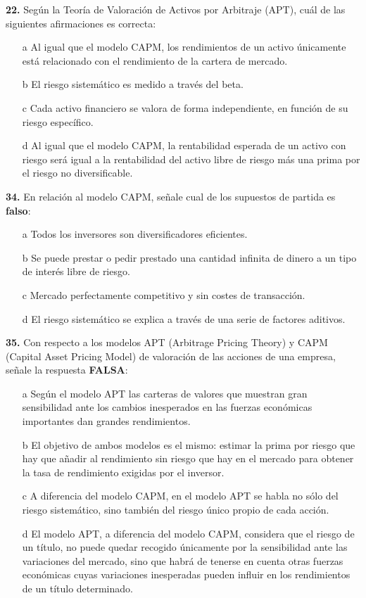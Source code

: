 \documentclass{nuevotema}
\begin{document}
\textbf{22.} Según la Teoría de Valoración de Activos por Arbitraje (APT), cuál de las siguientes afirmaciones es correcta:
\begin{enumerate}
	\item[a] Al igual que el modelo CAPM, los rendimientos de un activo únicamente está relacionado con el rendimiento de la cartera de mercado.
	\item[b] El riesgo sistemático es medido a través del beta.
	\item[c] Cada activo financiero se valora de forma independiente, en función de su riesgo específico.
	\item[d] Al igual que el modelo CAPM, la rentabilidad esperada de un activo con riesgo será igual a la rentabilidad del activo libre de riesgo más una prima por el riesgo no diversificable. 
\end{enumerate}

\textbf{34.} En relación al modelo CAPM, señale cual de los supuestos de partida es \textbf{falso}:
\begin{enumerate}
	\item[a] Todos los inversores son diversificadores eficientes.
	\item[b] Se puede prestar o pedir prestado una cantidad infinita de dinero a un tipo de interés libre de riesgo.
	\item[c] Mercado perfectamente competitivo y sin costes de transacción.
	\item[d] El riesgo sistemático se explica a través de una serie de factores aditivos.
\end{enumerate}

\textbf{35.} Con respecto a los modelos APT (Arbitrage Pricing Theory) y CAPM (Capital Asset Pricing Model) de valoración de las acciones de una empresa, señale la respuesta \textbf{FALSA}:
\begin{enumerate}
	\item[a] Según el modelo APT las carteras de valores que muestran gran sensibilidad ante los cambios inesperados en las fuerzas económicas importantes dan grandes rendimientos.
	\item[b] El objetivo de ambos modelos es el mismo: estimar la prima por riesgo que hay que añadir al rendimiento sin riesgo que hay en el mercado para obtener la tasa de rendimiento exigidas por el inversor.
	\item[c] A diferencia del modelo CAPM, en el modelo APT se habla no sólo del riesgo sistemático, sino también del riesgo único propio de cada acción.
	\item[d] El modelo APT, a diferencia del modelo CAPM, considera que el riesgo de un título, no puede quedar recogido únicamente por la sensibilidad ante las variaciones del mercado, sino que habrá de tenerse en cuenta otras fuerzas económicas cuyas variaciones inesperadas pueden influir en los rendimientos de un título determinado.
\end{enumerate}
\end{document}
